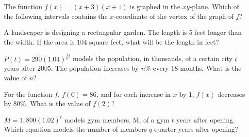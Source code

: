 \vspace{2em}

\noindent\markforreview
\vspace{1em}

The function $f(x) = (x + 3)(x + 1)$ is graphed in the $xy$-plane.  
Which of the following intervals contains the $x$-coordinate of the vertex of the graph of $f$?

\vspace{0.75em}


\vspace{2em}

\noindent\markforreview
\vspace{1em}

A landscaper is designing a rectangular garden. The length is 5 feet longer than the width.  
If the area is $104$ square feet, what will be the length in feet?

\vspace{5em}

\noindent\markforreview
\vspace{1em}

$P(t) = 290(1.04)^{\frac{4}{6}t}$ models the population, in thousands, of a certain city $t$ years after 2005.  
The population increases by $n\%$ every 18 months. What is the value of $n$?

\vspace{0.75em}


\newpage

\noindent\markforreview
\vspace{1em}

For the function $f$, $f(0) = 86$, and for each increase in $x$ by $1$, $f(x)$ decreases by $80\%$.  
What is the value of $f(2)$?

\vspace{2em}

\noindent\markforreview
\vspace{1em}

$M = 1,\!800(1.02)^t$ models gym members, M, of a gym $t$ years after opening.  
Which equation models the number of members $q$ quarter-years after opening?

\vspace{0.75em}


